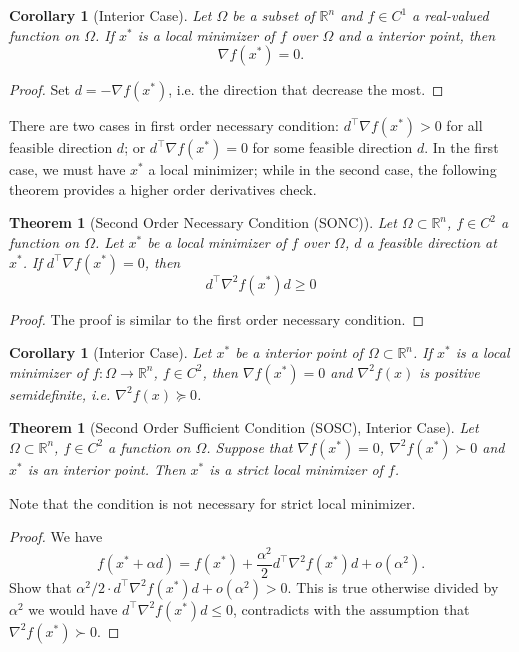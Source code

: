 \documentclass[12pt,a4paper]{report}
\numberwithin{equation}{section}
\theoremstyle{mystyle}
\newtheorem{theorem}[definition]{Theorem}
\newtheorem{corollary}[definition]{Corollary}
\newcommand{\R}{\mathbb{R}}
\newcommand{\grad}{\nabla}
\newcommand{\T}{\top}
\begin{document}
	\begin{corollary}[Interior Case]
		Let $\Omega$ be a subset of $\R^n$ and $f\in C^1$ a real-valued function on $\Omega$. If $x^*$ is a local minimizer of $f$ over $\Omega$ and a interior point, then 
		$$
		\grad f(x^*)=0.
		$$
	\end{corollary}
	\begin{proof}
		Set $d=-\grad f(x^*)$, i.e. the direction that decrease the most.
	\end{proof}
	
	There are two cases in first order necessary condition: $d^\T \grad f(x^*)>0$ for all feasible direction $d$; or $d^\T \grad f(x^*)=0$ for some feasible direction $d$. In the first case, we must have $x^*$ a local minimizer; while in the second case, the following theorem provides a higher order derivatives check.
	
	\begin{theorem}[Second Order Necessary Condition (SONC)]
		Let $\Omega\subset \R^n$, $f\in C^2$ a function on $\Omega$. Let $x^*$ be a local minimizer of $f$ over $\Omega$, $d$ a feasible direction at $x^*$. If $d^\T \grad f(x^*)=0$, then
		$$
		d^\T \grad^2 f(x^*) d\geq 0
		$$
	\end{theorem}
	\begin{proof}
		The proof is similar to the first order necessary condition.
	\end{proof}
	
	\begin{corollary}[Interior Case]
		Let $x^*$ be a interior point of $\Omega\subset \R^n$. If $x^*$ is a local minimizer of $f:\Omega\to \R^n$, $f\in C^2$, then $\grad f(x^*)=0$ and $\grad^2 f(x)$ is positive semidefinite, i.e. $\grad^2 f(x)\succeq 0$.
	\end{corollary}
	
	\begin{theorem}[Second Order Sufficient Condition (SOSC), Interior Case]
		Let $\Omega\subset \R^n$, $f\in C^2$ a function on $\Omega$. Suppose that $\grad f(x^*)=0$, $\grad^2f(x^*)\succ 0$ and $x^*$ is an interior point. Then $x^*$ is a strict local minimizer of $f$.
	\end{theorem}
	Note that the condition is not necessary for strict local minimizer.
	\begin{proof}
		We have
		$$
		f(x^*+\alpha d)=f(x^*)+\frac{\alpha^2}{2}d^\T \grad^2 f(x^*)d+o(\alpha^2).
		$$
		Show that $\alpha^2/2 \cdot d^\T \grad^2 f(x^*)d+o(\alpha^2)>0$. This is true otherwise divided by $\alpha^2$ we would have $d^\T \grad^2 f(x^*)d\leq 0$, contradicts with the assumption that $\grad^2 f(x^*)\succ 0$.
	\end{proof}
\end{document}
